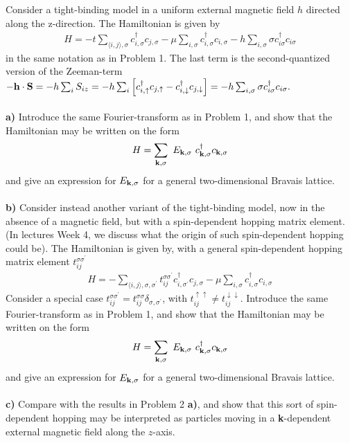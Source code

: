 \begin{problem}
Consider a tight-binding model in a uniform external magnetic field $h$ directed along the z-direction.
The Hamiltonian is given by 
\begin{eqnarray}
	H = - t \sum_{\langle i,j \rangle, \sigma} c^{\dagger}_{i,\sigma} c_{j,\sigma} - \mu   \sum_{ i, \sigma} c^{\dagger}_{i,\sigma} c_{i,\sigma}
	- h \sum_{i, \sigma} \sigma c^{\dagger}_{i \sigma}  c_{i \sigma}  
	\nonumber 
\end{eqnarray}
in the same notation as in Problem 1. The last term is the second-quantized version of the Zeeman-term 
$- {\bf h} \cdot {\bf S} = - h \sum_i S_{i z} = - h \sum_{i} \left[ c^{\dagger}_{i,\uparrow} c_{j,\uparrow}- c^{\dagger}_{i,\downarrow} c_{j,\downarrow} \right] =-  h \sum_{i, \sigma} \sigma c^{\dagger}_{i \sigma}  c_{i \sigma}.$
\ \\
\ \\
{\bf a)} Introduce the same Fourier-transform as in Problem 1, and show that the Hamiltonian may be written on the form
\begin{eqnarray}
	H = \sum_{{\bf k},\sigma} ~ E_{\bf k, \sigma} ~ c^{\dagger}_{{\bf k},\sigma} c_{{\bf k},\sigma}  \nonumber 
\end{eqnarray}
and give an expression for $E_{{\bf k},\sigma}$ for a general two-dimensional Bravais lattice. 
\ \\
\ \\
{\bf b)}  Consider instead  another variant of the tight-binding model, now in the absence of a magnetic field, but with a spin-dependent hopping matrix element. (In lectures Week 4, we discuss what the origin of such spin-dependent hopping could be). The Hamiltonian is given by, with a general spin-dependent hopping matrix element $ t^{\sigma \sigma^{\prime}}_{ij}$
\begin{eqnarray}
	H = -  \sum_{\langle i,j \rangle, \sigma, \sigma^{\prime}} t^{\sigma \sigma^{\prime}}_{ij}c^{\dagger}_{i,\sigma^{\prime}} c_{j,\sigma} - \mu   \sum_{ i, \sigma} c^{\dagger}_{i,\sigma} c_{i,\sigma}
	\nonumber 
\end{eqnarray}
Consider a special case $ t^{\sigma \sigma^{\prime}}_{ij} = t^{\sigma \sigma}_{ij} \delta_{\sigma,\sigma^{\prime}}$, with 
$t_{ij}^{\uparrow \uparrow} \neq t_{ij}^{\downarrow \downarrow}$.  Introduce the same Fourier-transform as in Problem 1, and show that the Hamiltonian may be written on the form
\begin{eqnarray}
	H = \sum_{{\bf k},\sigma} ~ E_{\bf k, \sigma} ~ c^{\dagger}_{{\bf k},\sigma} c_{{\bf k},\sigma}  \nonumber 
\end{eqnarray}
and give an expression for $E_{{\bf k},\sigma}$ for a general two-dimensional Bravais lattice. 
\ \\
\ \\
{\bf c)} Compare with the results in Problem 2 {\bf a)}, and show that this sort of spin-dependent hopping may be interpreted as particles moving in  a {\bf k}-dependent external magnetic field along the $z$-axis.  
\end{problem}
